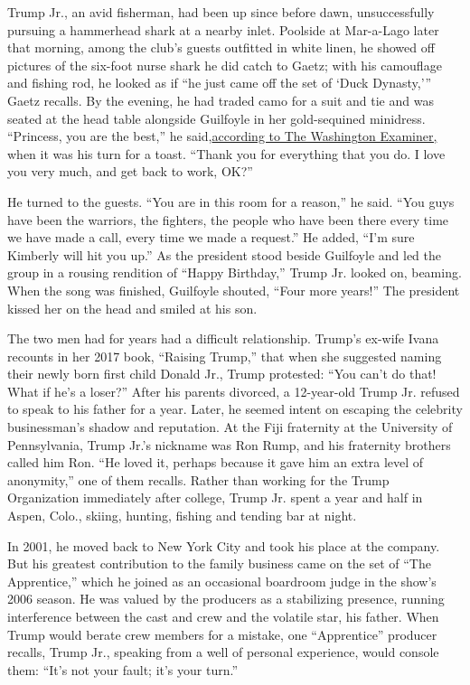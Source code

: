 Trump Jr., an avid fisherman, had been up since before dawn,
unsuccessfully pursuing a hammerhead shark at a nearby inlet. Poolside
at Mar-a-Lago later that morning, among the club's guests outfitted in
white linen, he showed off pictures of the six-foot nurse shark he did
catch to Gaetz; with his camouflage and fishing rod, he looked as if
``he just came off the set of `Duck Dynasty,''' Gaetz recalls. By the
evening, he had traded camo for a suit and tie and was seated at the
head table alongside Guilfoyle in her gold-sequined minidress.
``Princess, you are the best,'' he
said,\href{https://www.washingtonexaminer.com/news/trump-world-celebrates-kimberly-guilfoyles-birthday-at-mar-a-lago}{according
to The Washington Examiner,} when it was his turn for a toast. ``Thank
you for everything that you do. I love you very much, and get back to
work, OK?''

He turned to the guests. ``You are in this room for a reason,'' he said.
``You guys have been the warriors, the fighters, the people who have
been there every time we have made a call, every time we made a
request.'' He added, ``I'm sure Kimberly will hit you up.'' As the
president stood beside Guilfoyle and led the group in a rousing
rendition of ``Happy Birthday,'' Trump Jr. looked on, beaming. When the
song was finished, Guilfoyle shouted, ``Four more years!'' The president
kissed her on the head and smiled at his son.

The two men had for years had a difficult relationship. Trump's ex-wife
Ivana recounts in her 2017 book, ``Raising Trump,'' that when she
suggested naming their newly born first child Donald Jr., Trump
protested: ``You can't do that! What if he's a loser?'' After his
parents divorced, a 12-year-old Trump Jr. refused to speak to his father
for a year. Later, he seemed intent on escaping the celebrity
businessman's shadow and reputation. At the Fiji fraternity at the
University of Pennsylvania, Trump Jr.'s nickname was Ron Rump, and his
fraternity brothers called him Ron. ``He loved it, perhaps because it
gave him an extra level of anonymity,'' one of them recalls. Rather than
working for the Trump Organization immediately after college, Trump Jr.
spent a year and half in Aspen, Colo., skiing, hunting, fishing and
tending bar at night.

In 2001, he moved back to New York City and took his place at the
company. But his greatest contribution to the family business came on
the set of ``The Apprentice,'' which he joined as an occasional
boardroom judge in the show's 2006 season. He was valued by the
producers as a stabilizing presence, running interference between the
cast and crew and the volatile star, his father. When Trump would berate
crew members for a mistake, one ``Apprentice'' producer recalls, Trump
Jr., speaking from a well of personal experience, would console them:
``It's not your fault; it's your turn.''


